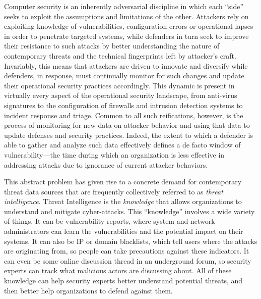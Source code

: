 \begin{dissertationintroduction}

Computer security is an inherently adversarial discipline in which
each ``side'' seeks to exploit the assumptions and limitations of the
other.  Attackers rely on exploiting knowledge of vulnerabilities,
configuration errors or operational lapses in order to penetrate
targeted systems, while defenders in turn seek to improve their
resistance to such attacks by better understanding the nature of
contemporary threats and the technical fingerprints left by attacker's
craft.  Invariably, this means that attackers are driven to innovate
and diversify while defenders, in response, must continually monitor
for such changes and update their operational security practices
accordingly.  This dynamic is present in virtually every aspect of the
operational security landscape, from anti-virus signatures to the
configuration of firewalls and intrusion detection systems to incident
response and triage.  Common to all such reifications, however, is the
process of monitoring for new data on attacker behavior and using that
data to update defenses and security practices. Indeed, the extent to
which a defender is able to gather and analyze such data effectively
defines a de facto window of vulnerability---the time during which an
organization is less effective in addressing attacks due to ignorance
of current attacker behaviors.

This abstract problem has given rise to a concrete demand for
contemporary threat data sources that are frequently collectively
referred to as \emph{threat intelligence}. Threat Intelligence 
is the \emph{knowledge} that allows organizations to understand and 
mitigate cyber-attacks. This ``knowledge'' involves a wide variety 
of things. It can be vulnerability reports, where system and 
network administrators can learn the vulnerabilities and the potential
impact on their systems. It can also be IP or domain blacklists,
which tell users where the attacks are originating from, so people
can take precautions against these indicators. It can even be some 
online discussion thread in an underground forum, so security 
experts can track what malicious actors are discussing about. 
All of these knowledge can help security experts better understand 
potential threats, and then better help organizations to defend 
against them.


\end{dissertationintroduction}
